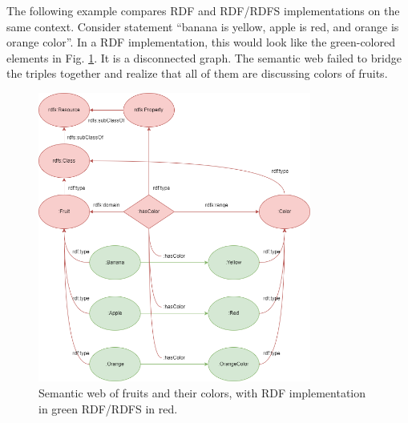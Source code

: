 The following example compares RDF and RDF/RDFS implementations on the same context. Consider statement ``banana is yellow, apple is red, and orange is orange color''. In a RDF implementation, this would look like the green-colored elements in Fig. \ref{fig:fruitexp}. It is a disconnected graph. The semantic web failed to bridge the triples together and realize that all of them are discussing colors of fruits.
\begin{figure}[htbp]
	\centering
	\includegraphics[width=0.8\textwidth]{./chapters/ch-semanticwebarchitecture/figures/fruitexp.png}
	\caption{Semantic web of fruits and their colors, with RDF implementation in green RDF/RDFS in red.}
	\label{fig:fruitexp}
\end{figure}

